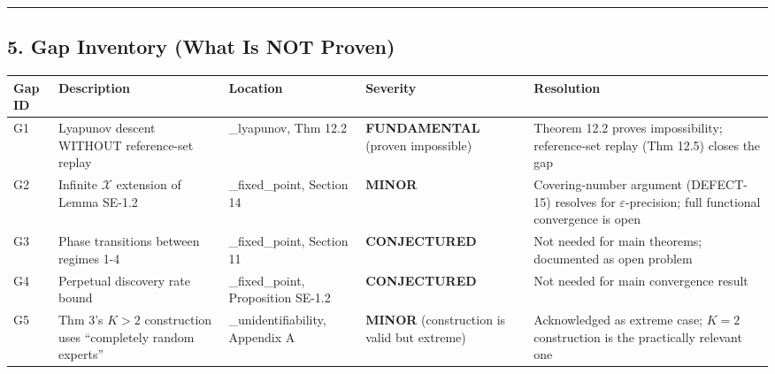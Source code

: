 \documentclass[
  12pt,
]{article}
\begin{document}
\begin{center}\rule{0.5\linewidth}{0.5pt}\end{center}

\subsection{5. Gap Inventory (What Is NOT
Proven)}\label{gap-inventory-what-is-not-proven}

\begin{longtable}[]{@{}
  >{\raggedright\arraybackslash}p{}
  >{\raggedright\arraybackslash}p{}
  >{\raggedright\arraybackslash}p{}
  >{\raggedright\arraybackslash}p{}
  >{\raggedright\arraybackslash}p{}@{}}
\toprule\noalign{}
\begin{minipage}[b]{\linewidth}\raggedright
Gap ID
\end{minipage} & \begin{minipage}[b]{\linewidth}\raggedright
Description
\end{minipage} & \begin{minipage}[b]{\linewidth}\raggedright
Location
\end{minipage} & \begin{minipage}[b]{\linewidth}\raggedright
Severity
\end{minipage} & \begin{minipage}[b]{\linewidth}\raggedright
Resolution
\end{minipage} \\
\midrule\noalign{}
\endhead
\bottomrule\noalign{}
\endlastfoot
G1 & Lyapunov descent WITHOUT reference-set replay & 10\_lyapunov, Thm
12.2 & \textbf{FUNDAMENTAL} (proven impossible) & Theorem 12.2 proves
impossibility; reference-set replay (Thm 12.5) closes the gap \\
G2 & Infinite \(\mathcal{X}\) extension of Lemma SE-1.2 &
06\_fixed\_point, Section 14 & \textbf{MINOR} & Covering-number argument
(DEFECT-15) resolves for \(\varepsilon\)-precision; full functional
convergence is open \\
G3 & Phase transitions between regimes 1-4 & 06\_fixed\_point, Section
11 & \textbf{CONJECTURED} & Not needed for main theorems; documented as
open problem \\
G4 & Perpetual discovery rate bound & 06\_fixed\_point, Proposition
SE-1.2 & \textbf{CONJECTURED} & Not needed for main convergence
result \\
G5 & Thm 3's \(K>2\) construction uses ``completely random experts'' &
03\_unidentifiability, Appendix A & \textbf{MINOR} (construction is
valid but extreme) & Acknowledged as extreme case; \(K=2\) construction
is the practically relevant one \\
\end{longtable}
\end{document}

